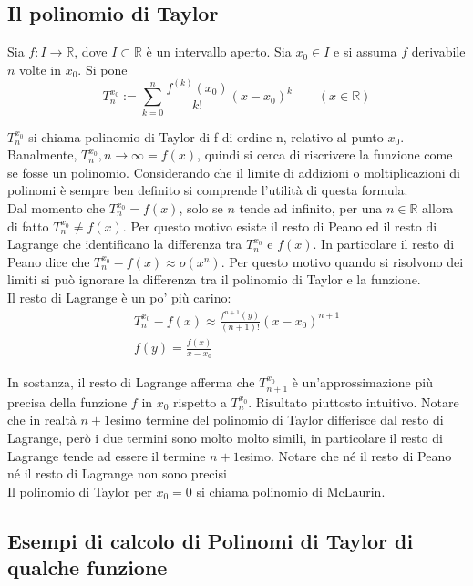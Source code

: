 \documentclass{article}
\begin{document}
\subsection{Il polinomio di Taylor}

Sia $f:I \rightarrow \mathbb{R}$, dove $I \subset \mathbb{R}$ è un intervallo aperto. Sia $x_0 \in I$ e si assuma $f$ derivabile $n$ volte in $x_0$. Si pone
\begin{equation}
	T^{x_0}_n:= \sum^n_{k=0}\frac{f^{(k)}(x_0)}{k!}(x-x_0)^k \qquad (x \in \mathbb{R})
\end{equation}

$T^{x_0}_n$ si chiama polinomio di Taylor di f di ordine n, relativo al punto $x_0$. Banalmente, $T^{x_0}_n,n \rightarrow \infty= f(x)$, quindi si cerca di riscrivere la funzione come se fosse un polinomio. Considerando che il limite di addizioni o moltiplicazioni di polinomi è sempre ben definito si comprende l'utilità di questa formula. \\
Dal momento che $T^{x_0}_n= f(x)$, solo se $n$ tende ad infinito, per una $n\in \mathbb{R}$ allora di fatto $T^{x_0}_n \neq f(x)$. Per questo motivo esiste il resto di Peano ed il resto di Lagrange che identificano la differenza tra $T^{x_0}_n$ e $f(x)$. In particolare il resto di Peano dice che $T^{x_0}_n-f(x)\approx o(x^n)$. Per questo motivo quando si risolvono dei limiti si può ignorare la differenza tra il polinomio di Taylor e la funzione. \\
Il resto di Lagrange è un po' più carino:
\begin{gather*}
	T^{x_0}_n-f(x) \approx \frac{f^{n+1}(y)}{(n+1)!}(x-x_0)^{n+1}\\
	f(y)=\frac{f(x)}{x-x_0}
\end{gather*}

In sostanza, il resto di Lagrange afferma che $T^{x_0}_{n+1}$ è un'approssimazione più precisa della funzione $f$ in $x_0$ rispetto a $T^{x_0}_n$. Risultato piuttosto intuitivo. Notare che in realtà $n+1$esimo termine del polinomio di Taylor differisce dal resto di Lagrange, però i due termini sono molto molto simili, in particolare il resto di Lagrange tende ad essere il termine $n+1$esimo. Notare che né il resto di Peano né il resto di Lagrange non sono precisi\\
Il polinomio di Taylor per $x_0=0$ si chiama polinomio di McLaurin.

\subsection{Esempi di calcolo di Polinomi di Taylor di qualche funzione}
\end{document}
